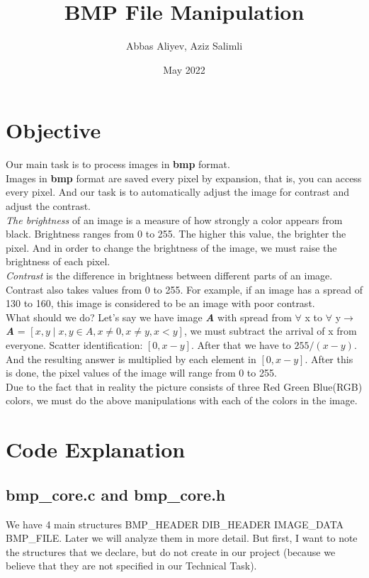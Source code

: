 \documentclass{article}
\title{BMP File Manipulation}
\author{Abbas Aliyev, Aziz Salimli }
\date{May 2022}
\begin{document}
\maketitle

\section{Objective}

Our main task is to process images in \textbf{bmp} format.
\\[1\baselineskip]
Images in \textbf{bmp} format are saved every pixel by expansion, that is, you can access every pixel. And our task is to automatically adjust the image for contrast and adjust the contrast.
\\[1\baselineskip]
\textit{The brightness} of an image is a measure of how strongly a color appears from black. Brightness ranges from 0 to 255. The higher this value, the brighter the pixel. And in order to change the brightness of the image, we must raise the brightness of each pixel.
\\[1\baselineskip]
\textit{Contrast} is the difference in brightness between different parts of an image. Contrast also takes values from 0 to 255. For example, if an image has a spread of 130 to 160, this image is considered to be an image with poor contrast.
\\[1\baselineskip]
What should we do? Let's say we have image \textbf{\textit{A}} with spread from $\forall$ x to $\forall$ y$\rightarrow$ \textbf{\textit{A}}  = $[x,y  \mid x, y \in A,x \neq 0 , x \neq y, x<y]$, we must subtract the arrival of x from everyone. Scatter identification: $[0,x-y]$. After that we have to $255/(x-y)$. And the resulting answer is multiplied by each element in $[0,x-y]$. After this is done, the pixel values of the image will range from 0 to 255.
\\[1\baselineskip]
Due to the fact that in reality the picture consists of three Red Green Blue(RGB) colors, we must do the above manipulations with each of the colors in the image.

\section{Code Explanation}
\subsection{bmp\_core.c and bmp\_core.h}

We have 4 main structures BMP\_HEADER DIB\_HEADER IMAGE\_DATA BMP\_FILE. Later we will analyze them in more detail. But first, I want to note the structures that we declare, but do not create in our project (because we believe that they are not specified in our Technical Task).
\end{document}
